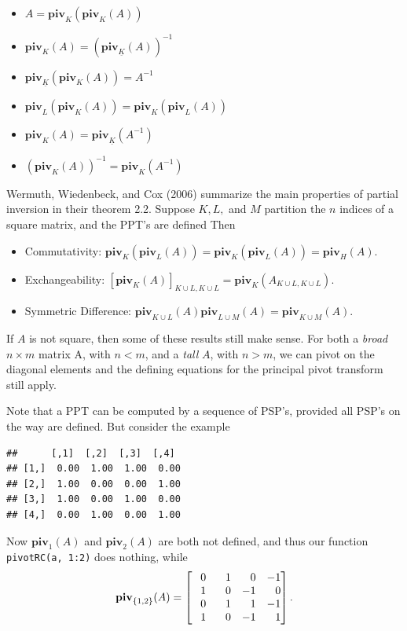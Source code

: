 \documentclass[12pt,]{article}
\providecommand{\tightlist}{%
  \setlength{\itemsep}{0pt}\setlength{\parskip}{0pt}}
\begin{document}
\begin{itemize}
\tightlist
\item
  \(A=\mathbf{piv}_K(\mathbf{piv}_K(A))\)
\item
  \(\mathbf{piv}_K(A)=(\mathbf{piv}_{\underline K}(A))^{-1}\)
\item
  \(\mathbf{piv}_{\underline K}(\mathbf{piv}_K(A))=A^{-1}\)
\item
  \(\mathbf{piv}_L(\mathbf{piv}_K(A))=\mathbf{piv}_K(\mathbf{piv}_L(A))\)
\item
  \(\mathbf{piv}_K(A)=\mathbf{piv}_{\underline K}(A^{-1})\)
\item
  \((\mathbf{piv}_K(A))^{-1}=\mathbf{piv}_K(A^{-1})\)
\end{itemize}

Wermuth, Wiedenbeck, and Cox (2006) summarize the main properties of
partial inversion in their theorem 2.2. Suppose \(K,L,\) and \(M\)
partition the \(n\) indices of a square matrix, and the PPT's are
defined Then

\begin{itemize}
\tightlist
\item
  Commutativity:
  \(\mathbf{piv}_K(\mathbf{piv}_L(A))=\mathbf{piv}_K(\mathbf{piv}_L(A))=\mathbf{piv}_H(A)\).
\item
  Exchangeability:
  \([\mathbf{piv}_K(A)]_{K\cup L,K\cup L}=\mathbf{piv}_K(A_{K\cup L,K\cup L})\).
\item
  Symmetric Difference:
  \(\mathbf{piv}_{K\cup L}(A)\mathbf{piv}_{L\cup M}(A)=\mathbf{piv}_{K\cup M}(A)\).
\end{itemize}

If \(A\) is not square, then some of these results still make sense. For
both a \emph{broad} \(n\times m\) matrix A, with \(n<m\), and a
\emph{tall} \(A\), with \(n>m\), we can pivot on the diagonal elements
and the defining equations for the principal pivot transform still
apply.

Note that a PPT can be computed by a sequence of PSP's, provided all
PSP's on the way are defined. But consider the example

\begin{verbatim}
##      [,1]  [,2]  [,3]  [,4] 
## [1,]  0.00  1.00  1.00  0.00
## [2,]  1.00  0.00  0.00  1.00
## [3,]  1.00  0.00  1.00  0.00
## [4,]  0.00  1.00  0.00  1.00
\end{verbatim}

Now \(\mathbf{piv}_1(A)\) and \(\mathbf{piv}_2(A)\) are both not
defined, and thus our function \texttt{pivotRC(a,\ 1:2)} does nothing,
while \[
\mathbf{piv}_{\{1,2\}}(A)=\begin{bmatrix}
\hphantom{+}0&\hphantom{+}1&\hphantom{+}0&-1\\
\hphantom{+}1&\hphantom{+}0&-1&\hphantom{+}0\\
\hphantom{+}0&\hphantom{+}1&\hphantom{+}1&-1\\
\hphantom{+}1&\hphantom{+}0&-1&\hphantom{+}1
\end{bmatrix}.
\]
\end{document}
